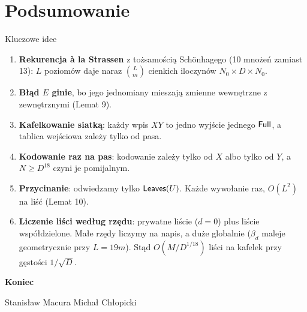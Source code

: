 \section{Podsumowanie}

\begin{frame}{Kluczowe idee}
  \begin{enumerate}
    \item<1-> \textbf{Rekurencja à la Strassen} z tożsamością Schönhagego (10 mnożeń zamiast 13):
      $L$ poziomów daje naraz $\binom Lm$ cienkich iloczynów $N_0\times D\times N_0$.
    \item<2-> \textbf{Błąd $E$ ginie}, bo jego jednomiany mieszają zmienne wewnętrzne z zewnętrznymi (Lemat 9).
    \item<3-> \textbf{Kafelkowanie siatką}: każdy wpis $XY$ to jedno wyjście jednego $\mathsf{Full}$, a tablica wejściowa zależy tylko od pasa.
    \item<4-> \textbf{Kodowanie raz na pas}: kodowanie zależy tylko od $X$ albo tylko od $Y$, a $N\ge D^{18}$ czyni je pomijalnym.
    \item<5-> \textbf{Przycinanie}: odwiedzamy tylko $\mathsf{Leaves}(U)$. Każde wywołanie raz, $O(L^2)$ na liść (Lemat 10).
    \item<6-> \textbf{Liczenie liści według rzędu}: prywatne liście ($d=0$) plus liście współdzielone.
      Małe rzędy liczymy na napis, a duże globalnie ($\beta_d$ maleje geometrycznie przy $L=19m$).
      Stąd $O(M/D^{1/18})$ liści na kafelek przy gęstości $1/\sqrt D$.
  \end{enumerate}
\end{frame}

\begin{frame}[c]
  \centering

  \vspace{0.8em}
  {\Huge\textcolor{structure}{\textbf{Koniec}}}

  \vspace{1em}
  {\large Stanisław Macura \quad Michał Chłopicki}
\end{frame}
